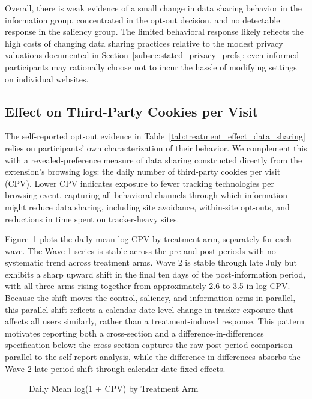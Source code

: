 \documentclass[12pt]{article}
\theoremstyle{definition}
\theoremstyle{remark}
\begin{document}
\begin{appendix}
Overall, there is weak evidence of a small change in data sharing behavior in the information group, concentrated in the opt-out decision, and no detectable response in the saliency group. The limited behavioral response likely reflects the high costs of changing data sharing practices relative to the modest privacy valuations documented in Section~\ref{subsec:stated_privacy_prefs}: even informed participants may rationally choose not to incur the hassle of modifying settings on individual websites.

\subsection{Effect on Third-Party Cookies per Visit}\label{subsec:info_treatment_cpv}

The self-reported opt-out evidence in Table~\ref{tab:treatment_effect_data_sharing} relies on participants' own characterization of their behavior. We complement this with a revealed-preference measure of data sharing constructed directly from the extension's browsing logs: the daily number of third-party cookies per visit (CPV). Lower CPV indicates exposure to fewer tracking technologies per browsing event, capturing all behavioral channels through which information might reduce data sharing, including site avoidance, within-site opt-outs, and reductions in time spent on tracker-heavy sites.

Figure~\ref{fig:cpv_trend_by_treatment} plots the daily mean log CPV by treatment arm, separately for each wave. The Wave 1 series is stable across the pre and post periods with no systematic trend across treatment arms. Wave 2 is stable through late July but exhibits a sharp upward shift in the final ten days of the post-information period, with all three arms rising together from approximately 2.6 to 3.5 in log CPV. Because the shift moves the control, saliency, and information arms in parallel, this parallel shift reflects a calendar-date level change in tracker exposure that affects all users similarly, rather than a treatment-induced response. This pattern motivates reporting both a cross-section and a difference-in-differences specification below: the cross-section captures the raw post-period comparison parallel to the self-report analysis, while the difference-in-differences absorbs the Wave 2 late-period shift through calendar-date fixed effects.

\begin{figure}[H]
\centering
\caption{Daily Mean log(1 + CPV) by Treatment Arm}
\label{fig:cpv_trend_by_treatment}


\end{figure}
\end{appendix}
\end{document}
